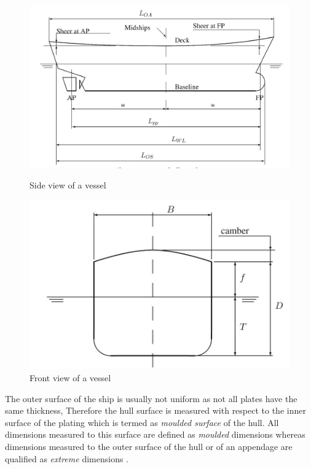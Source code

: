 \begin{figure}[ht]
    \centering
    \begin{minipage}[b]{0.5\linewidth}
        \includegraphics[width=\linewidth]{02_figures/biran14_shipside .jpg}
        \caption{Side view of a vessel}
        \label{fig:biran14_shipside}
    \end{minipage}
    \hfill
    \begin{minipage}[b]{0.45\linewidth}
        \includegraphics[width=\linewidth]{02_figures/biran14_frontship .jpg}
        \caption{Front view of a vessel}
        \label{fig:biran14_shipfront}
    \end{minipage}
\end{figure}

The outer surface of the ship is usually not uniform as not all plates have the same thickness, Therefore the hull surface is measured with respect to the inner surface of the plating which is termed as \emph{moulded surface} of the hull. All dimensions measured to this surface are defined as \emph{moulded} dimensions whereas dimensions measured to the outer surface of the hull or of an appendage are qualified as \emph{extreme} dimensions .

